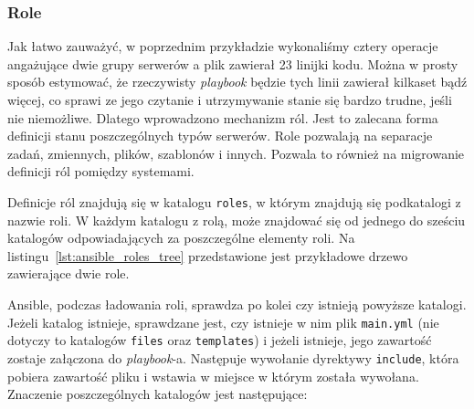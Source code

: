 \subsubsection{Role}
Jak łatwo zauważyć, w poprzednim przykładzie wykonaliśmy cztery operacje angażujące dwie grupy serwerów a plik zawierał 23 linijki kodu.
Można w prosty sposób estymować, że rzeczywisty \textit{playbook} będzie tych linii zawierał kilkaset bądź więcej, co sprawi ze jego czytanie i utrzymywanie stanie się bardzo trudne, jeśli nie niemożliwe.
Dlatego wprowadzono mechanizm ról.
Jest to zalecana forma definicji stanu poszczególnych typów serwerów.
Role pozwalają na separacje zadań, zmiennych, plików, szablonów i innych.
Pozwala to również na migrowanie definicji ról pomiędzy systemami.

Definicje ról znajdują się w katalogu \texttt{roles}, w którym znajdują się podkatalogi z nazwie roli.
W każdym katalogu z rolą, może znajdować się od jednego do sześciu katalogów odpowiadających za poszczególne elementy roli.
Na listingu~\ref{lst:ansible_roles_tree} przedstawione jest przykładowe drzewo zawierające dwie role.

Ansible, podczas ładowania roli, sprawdza po kolei czy istnieją powyższe katalogi.
Jeżeli katalog istnieje, sprawdzane jest, czy istnieje w nim plik \texttt{main.yml} (nie dotyczy to katalogów \texttt{files} oraz \texttt{templates}) i jeżeli istnieje, jego zawartość zostaje załączona do \textit{playbook}-a.
Następuje wywołanie dyrektywy \texttt{include}, która pobiera zawartość pliku i wstawia w miejsce w którym została wywołana.\\
Znaczenie poszczególnych katalogów jest następujące:
